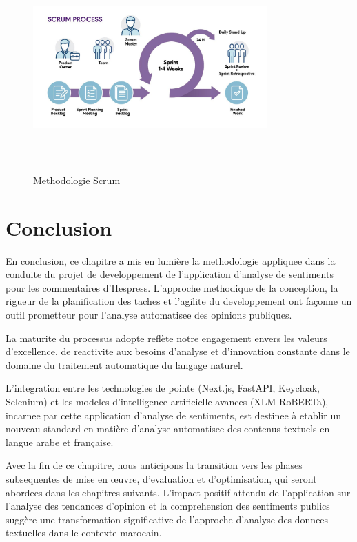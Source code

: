 \begin{figure}[H]
\centering
\includegraphics[height=8cm , width=0.8\textwidth]{assets/images/scrum.jpg}
\caption{Methodologie Scrum}
\label{fig:scrum}
\end{figure}

\section{Conclusion}

En conclusion, ce chapitre a mis en lumière la methodologie appliquee dans la conduite du projet de developpement de l'application d'analyse de sentiments pour les commentaires d'Hespress. L'approche methodique de la conception, la rigueur de la planification des taches et l'agilite du developpement ont façonne un outil prometteur pour l'analyse automatisee des opinions publiques.

La maturite du processus adopte reflète notre engagement envers les valeurs d'excellence, de reactivite aux besoins d'analyse et d'innovation constante dans le domaine du traitement automatique du langage naturel.

L'integration entre les technologies de pointe (Next.js, FastAPI, Keycloak, Selenium) et les modeles d'intelligence artificielle avances (XLM-RoBERTa), incarnee par cette application d'analyse de sentiments, est destinee à etablir un nouveau standard en matière d'analyse automatisee des contenus textuels en langue arabe et française.

Avec la fin de ce chapitre, nous anticipons la transition vers les phases subsequentes de mise en œuvre, d'evaluation et d'optimisation, qui seront abordees dans les chapitres suivants. L'impact positif attendu de l'application sur l'analyse des tendances d'opinion et la comprehension des sentiments publics suggère une transformation significative de l'approche d'analyse des donnees textuelles dans le contexte marocain.
